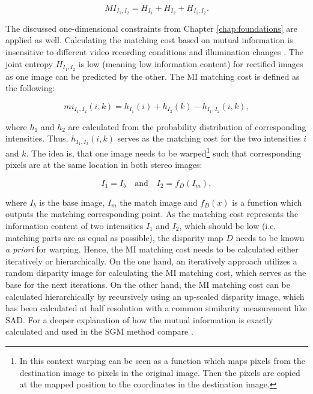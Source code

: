 \begin{equation}
  MI_{I_1,I_2} = H_{I_1} + H_{I_2} + H_{I_1,I_2}.
\end{equation}

\noindent The discussed one-dimensional constraints from Chapter \ref{chap:foundations} are applied as well.
Calculating the matching cost based on mutual information is insensitive to different video recording conditions and illumination changes \citep{hirschmuller2005accurate, viola1997alignment}.
The joint entropy $H_{I_1,I_2}$ is low (meaning low information content) for rectified images as one image can be predicted by the other.
The MI matching cost is defined as the following:

\begin{equation}
  mi_{I_1,I_2}(i,k) = h_{I_1}(i) + h_{I_2}(k) - h_{I_1,I_2}(i,k),
\end{equation}

\noindent where $h_1$ and $h_2$ are calculated from the probability distribution of corresponding intensities.
Thus, $h_{I_1,I_2}(i,k)$ serves as the matching cost for the two intensities $i$ and $k$.
The idea is, that one image needs to be warped\footnote{In this context warping can be seen as a function which maps pixels from the destination image to pixels in the original image. Then the pixels are copied at the mapped position to the coordinates in the destination image.} such that corresponding pixels are at the same location in both stereo images:

\begin{equation}
    I_1 = I_b\quad \textrm{and}\quad I_2 = f_D(I_m),
\end{equation}

\noindent where $I_b$ is the base image, $I_m$ the match image and $f_D(x)$ is a function which outputs the matching corresponding point.
As the matching cost represents the information content of two intensities $I_1$ and $I_2$, which should be low (i.e. matching parts are as equal as possible), the disparity map $D$ needs to be known \textit{a priori} for warping.
Hence, the MI matching cost needs to be calculated either iteratively or hierarchically.
On the one hand, an iteratively approach utilizes a random disparity image for calculating the MI matching cost, which serves as the base for the next iterations.
On the other hand, the MI matching cost can be calculated hierarchically by recursively using an up-scaled disparity image, which has been calculated at half resolution with a common similarity measurement like SAD.
For a deeper explanation of how the mutual information is exactly calculated and used in the SGM method compare \citep{hirschmuller2005accurate, hirschmuller2007evaluation, hirschmuller2008stereo, hirschmuller2011semi}.

